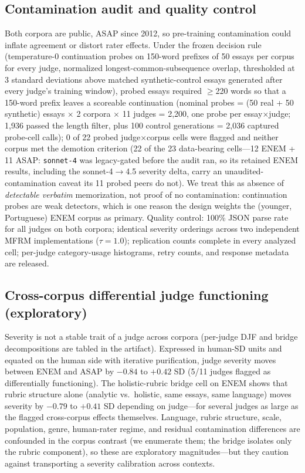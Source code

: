 \documentclass[fleqn,10pt]{JLA_article}
\begin{document}
\subsection{Contamination audit and quality control}
Both corpora are public, ASAP since 2012, so pre-training contamination could inflate agreement or distort rater effects. Under the frozen decision rule (temperature-0 continuation probes on 150-word prefixes of 50 essays per corpus for every judge, normalized longest-common-subsequence overlap, thresholded at 3 standard deviations above matched synthetic-control essays generated after every judge's training window), probed essays required $\geq$220 words so that a 150-word prefix leaves a scoreable continuation (nominal probes = (50 real + 50 synthetic) essays $\times$ 2 corpora $\times$ 11 judges = 2,200, one probe per essay$\times$judge; 1,936 passed the length filter, plus 100 control generations = 2,036 captured probe-cell calls); 0 of 22 probed judge$\times$corpus cells were flagged and neither corpus met the demotion criterion (22 of the 23 data-bearing cells---12 ENEM + 11 ASAP: \texttt{sonnet-4} was legacy-gated before the audit ran, so its retained ENEM results, including the sonnet-4$\to$4.5 severity delta, carry an unaudited-contamination caveat its 11 probed peers do not). We treat this as absence of \emph{detectable verbatim} memorization, not proof of no contamination: continuation probes are weak detectors, which is one reason the design weights the (younger, Portuguese) ENEM corpus as primary. Quality control: 100\% JSON parse rate for all judges on both corpora; identical severity orderings across two independent MFRM implementations ($\tau=1.0$); replication counts complete in every analyzed cell; per-judge category-usage histograms, retry counts, and response metadata are released.

\subsection{Cross-corpus differential judge functioning (exploratory)}
\label{sec:djf}
Severity is not a stable trait of a judge across corpora (per-judge DJF and bridge decompositions are tabled in the artifact). Expressed in human-SD units and equated
on the human side with iterative purification, judge severity moves between ENEM and ASAP by
$-0.84$ to $+0.42$ SD (5/11 judges flagged as differentially functioning). The holistic-rubric
bridge cell on ENEM shows that rubric structure alone (analytic vs.\ holistic, same essays, same
language) moves severity by $-0.79$ to $+0.41$ SD depending on judge---for several judges as large as the flagged cross-corpus effects themselves. Language, rubric structure,
scale, population, genre, human-rater regime, and residual contamination differences are
confounded in the corpus contrast (we enumerate them; the bridge isolates only the rubric
component), so these are exploratory magnitudes---but they caution against transporting a
severity calibration across contexts.
\end{document}
